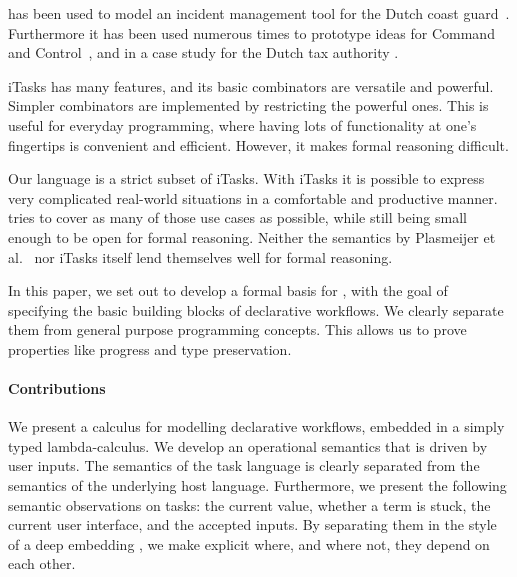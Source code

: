 \TOP has been used to model an incident management tool for the Dutch coast guard~\cite{conf/iscram/LijnseJP12}.
Furthermore it has been used numerous times to prototype ideas for Command and Control~\cite{theses/nlda/Kool17, theses/radboud/Stutterheim17}, and in a case study for the Dutch tax authority \cite{conf/sfp/StutterheimAP17}.

iTasks has many features, and its basic combinators are versatile and powerful.
Simpler combinators are implemented by restricting the powerful ones.
This is useful for everyday programming, where having lots of functionality at one's fingertips is convenient and efficient.
However, it makes formal reasoning difficult.

Our language is a strict subset of iTasks.
With iTasks it is possible to express very complicated real-world situations in a comfortable and productive manner.
\TOPHAT{}
tries to cover as many of those use cases as possible, while still being small enough to be open for formal reasoning.
Neither the semantics by Plasmeijer et al.~\cite{conf/ppdp/PlasmeijerLMAK12} nor iTasks itself lend themselves well for formal reasoning.




In this paper, we set out to develop a formal basis for \TOP, with the goal of specifying the basic building blocks of declarative workflows.
We clearly separate them from general purpose programming concepts.
This allows us to prove properties like progress and type preservation.



\paragraph{Contributions}

We present a calculus for modelling declarative workflows, embedded in a simply typed lambda-calculus.
We develop an operational semantics that is driven by user inputs.
The semantics of the task language is clearly separated from the semantics of the underlying host language.
Furthermore, we present the following semantic observations on tasks: the current value, whether a term is stuck, the current user interface, and the accepted inputs.
By separating them in the style of a deep embedding \cite{conf/cefp/Gibbons13}, we make explicit where, and where not, they depend on each other.

